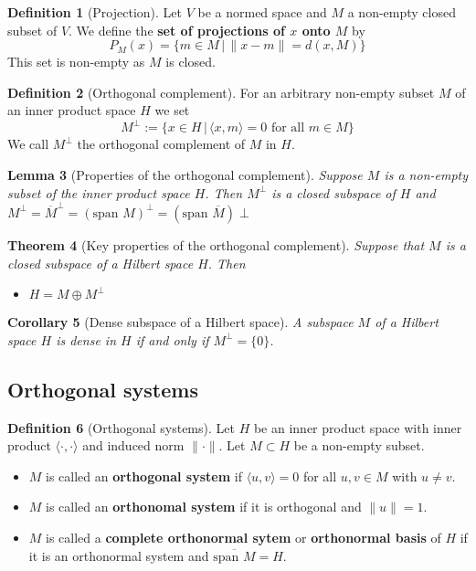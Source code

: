 \documentclass[10pt, oneside, reqno]{amsart}
\theoremstyle{plain}%
\newtheorem{thm}{Theorem}[section]
\newtheorem{lem}[thm]{Lemma}
\newtheorem{cor}[thm]{Corollary}
\theoremstyle{definition}
\newtheorem{defn}[thm]{Definition}
\theoremstyle{remark}
\newcommand{\iprod}[2]{\langle #1, #2 \rangle}
\newcommand{\ol}[1]{\overline{#1}}
\begin{document}
\begin{defn}[Projection]
	Let $V$ be a normed space and $M$ a non-empty closed subset of $V$.  We define the \textbf{set of projections of $x$ onto $M$} by \[
		P_M(x) = \{ m \in M \, | \, \|x - m \| = d(x, M) \}
	\]
	This set is non-empty as $M$ is closed.
\end{defn}
\begin{defn}[Orthogonal complement]
	For an arbitrary non-empty subset $M$ of an inner product space $H$ we set \[
		M^{\perp} := \{ x \in H \, | \, \iprod{x}{m} = 0 \text{ for all $m \in M$} \}
	\]
	We call $M^\perp$ the orthogonal complement of $M$ in $H$.
\end{defn}

\begin{lem}[Properties of the orthogonal complement]
	Suppose $M$ is a non-empty subset of the inner product space $H$.  Then $M^\perp$ is a closed subspace of $H$ and $M^\perp = \ol M^\perp = (\text{span $M$})^\perp = (\text{span $\ol M$})\perp$
\end{lem}

\begin{thm}[Key properties of the orthogonal complement]
	Suppose that $M$ is a closed subspace of a Hilbert space $H$. Then 
	\begin{itemize}
		\item $H = M \oplus M^\perp$ 
	\end{itemize}
	
	\end{thm}

\begin{cor}[Dense subspace of a Hilbert space]
	A subspace $M$ of a Hilbert space $H$ is dense in $H$ if and only if $M^\perp = \{0 \}$.
\end{cor}


\subsection{Orthogonal systems} %
\label{sub:orthogonal_systems}

\begin{defn}[Orthogonal systems]  
	Let $H$ be an inner product space with inner product $\iprod{\cdot}{\cdot}$ and induced norm $\| \cdot \|$.  Let $M \subset H$ be a non-empty subset.
	\begin{itemize}
		\item $M$ is called an \textbf{orthogonal system} if $\iprod{u}{v} = 0$ for all $u,v \in M$ with $u \neq v$.
		\item $M$ is called an \textbf{orthonomal system} if it is orthogonal and $\| u \| = 1$.
		\item $M$ is called a \textbf{complete orthonormal sytem} or \textbf{orthonormal basis} of $H$ if it is an orthonormal system and $\ol{\text{span $M$}} = H$.
	\end{itemize}

\end{defn}
\end{document}
